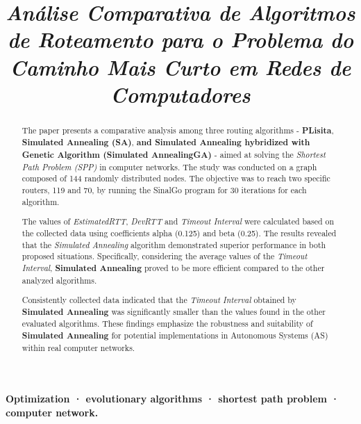 \documentclass[conference]{IEEEtran}
\begin{document}
\title{\textit{Análise Comparativa de Algoritmos de Roteamento para o Problema do Caminho Mais Curto em Redes de Computadores}}

\author{
}

\maketitle

\begin{abstract}
  The paper presents a comparative analysis among three routing algorithms - \textbf{PLisita}, \textbf{Simulated Annealing (SA)}, \textbf{and Simulated Annealing hybridized with Genetic Algorithm (Simulated AnnealingGA)} - aimed at solving the \textit{Shortest Path Problem (SPP)} in computer networks. The study was conducted on a graph composed of 144 randomly distributed nodes. The objective was to reach two specific routers, 119 and 70, by running the SinalGo program for 30 iterations for each algorithm.
  
  The values of \textit{EstimatedRTT}, \textit{DevRTT} and \textit{Timeout Interval} were calculated based on the collected data using coefficients alpha (0.125) and beta (0.25). The results revealed that the \textit{Simulated Annealing} algorithm demonstrated superior performance in both proposed situations. Specifically, considering the average values of the \textit{Timeout Interval}, \textbf{Simulated Annealing} proved to be more efficient compared to the other analyzed algorithms.
  
  Consistently collected data indicated that the \textit{Timeout Interval} obtained by \textbf{Simulated Annealing} was significantly smaller than the values found in the other evaluated algorithms. These findings emphasize the robustness and suitability of \textbf{Simulated Annealing} for potential implementations in Autonomous Systems (AS) within real computer networks.
\end{abstract}
\begin{IEEEkeywords}
\textbf{Optimization · evolutionary algorithms · shortest path problem  · computer network.}
\end{IEEEkeywords}
\end{document}
